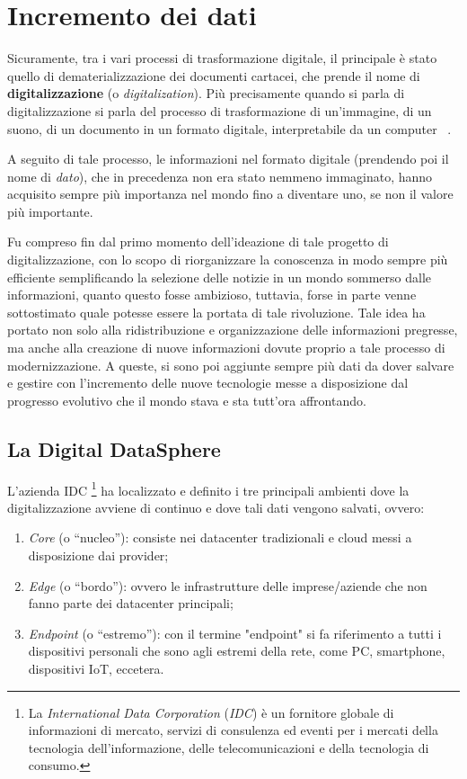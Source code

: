 \section{Incremento dei dati}

Sicuramente, tra i vari processi di trasformazione digitale, il principale è stato quello di dematerializzazione dei documenti cartacei, che prende il nome di \textbf{digitalizzazione} (o \textit{digitalization}). Più precisamente quando si parla di digitalizzazione si parla del processo di trasformazione di un'immagine, di un suono, di un documento in un formato digitale, interpretabile da un computer ~\cite{wikipedia_digitalization_definition}.

A seguito di tale processo, le informazioni nel formato digitale (prendendo poi il nome di \textit{dato}), che in precedenza non era stato nemmeno immaginato, hanno acquisito sempre più importanza nel mondo fino a diventare uno, se non il valore più importante.

Fu compreso fin dal primo momento dell'ideazione di tale progetto di digitalizzazione, con lo scopo di riorganizzare la conoscenza in modo sempre più efficiente semplificando la selezione delle notizie in un mondo sommerso dalle informazioni, quanto questo fosse ambizioso, tuttavia, forse in parte venne sottostimato quale potesse essere la portata di tale rivoluzione. Tale idea ha portato non solo alla ridistribuzione e organizzazione delle informazioni pregresse, ma anche alla creazione di nuove informazioni dovute proprio a tale processo di modernizzazione. A queste, si sono poi aggiunte sempre più dati da dover salvare e gestire con l'incremento delle nuove tecnologie messe a disposizione dal progresso evolutivo che il mondo stava e sta tutt'ora affrontando. 

\subsection{La Digital DataSphere}

L'azienda IDC \footnote{La \textit{International Data Corporation} (\textit{IDC}) è un fornitore globale di informazioni di mercato, servizi di consulenza ed eventi per i mercati della tecnologia dell'informazione, delle telecomunicazioni e della tecnologia di consumo.} ha localizzato e definito i tre principali ambienti dove la digitalizzazione avviene di continuo e dove tali dati vengono salvati, ovvero:~\cite{idc_digital_datasphere}

\begin{enumerate}
    \item \textit{Core} (o “nucleo”): consiste nei datacenter tradizionali e cloud messi a disposizione dai provider;
    \item \textit{Edge} (o “bordo”): ovvero le infrastrutture delle imprese/aziende che non fanno parte dei datacenter principali; 
    \item \textit{Endpoint} (o “estremo”): con il termine "endpoint" si fa riferimento a tutti i dispositivi personali che sono agli estremi della rete, come PC, smartphone, dispositivi IoT, eccetera. 
\end{enumerate}

